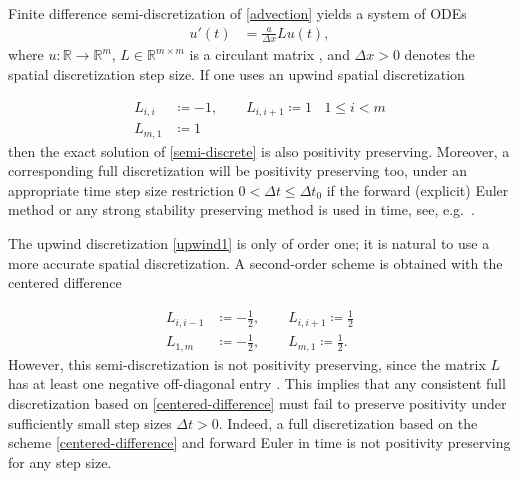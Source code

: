 \documentclass[a4paper]{article}
\newcommand{\dt}{\Delta t}
\newcommand{\dx}{\Delta x}
\begin{document}
Finite difference semi-discretization of \eqref{advection} yields a system of ODEs
\begin{align} \label{semi-discrete}
    u'(t) & = \frac{a}{\dx}Lu(t),
\end{align}
where $u:\mathbb{R}\to\mathbb{R}^m$, $L\in\mathbb{R}^{m\times m}$ is a circulant matrix  \cite[Section 5.16]{matmat}, and $\dx>0$ denotes the spatial discretization step size.  
If one uses an upwind spatial discretization

\begin{subequations}
\label{upwind1}
\begin{align} 
    L_{i,i}  & \coloneqq -1,\quad\quad L_{i,i+1} \coloneqq  1 \ \ \ \ 1\le i < m \\
    L_{m,1} & \coloneqq 1
\end{align}
\end{subequations}
then the exact solution of \eqref{semi-discrete} is also positivity
preserving. Moreover, a corresponding full discretization will be positivity preserving too,
under an appropriate time step size restriction $0<\dt\le\dt_0$
if the forward (explicit) Euler method or any strong stability preserving
method \cite{SSPbook} is used in time, see, e.g.~\cite{posconv}.  

The upwind discretization \eqref{upwind1} is only of order one; it is natural
to use a more accurate spatial discretization. A second-order scheme is
obtained with the centered difference

\begin{subequations}
\label{centered-difference}
\begin{align}
    L_{i,i-1} & \coloneqq -\frac{1}{2},\quad\quad L_{i,i+1} \coloneqq  \frac{1}{2} \\
    L_{1,m} & \coloneqq -\frac{1}{2}, \quad \quad L_{m,1} \coloneqq \frac{1}{2}.
\end{align}
\end{subequations}
However, this semi-discretization is not positivity preserving, since the
matrix $L$ has at least one negative off-diagonal entry \cite[Chapter I,
Theorem 7.2]{hundsdorferverwer}.
This implies that any consistent full discretization based on \eqref{centered-difference}
must fail to preserve positivity under sufficiently small step sizes $\dt>0$.
Indeed, a full discretization based on the scheme \eqref{centered-difference}
and forward Euler in time is not positivity preserving for any step size.
\end{document}
